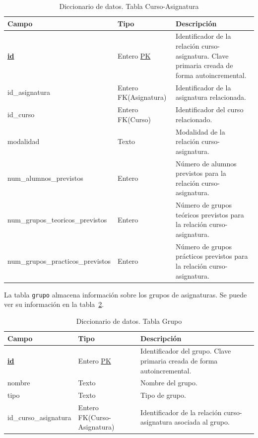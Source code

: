 \begin{table}
  \centering
  \begin{tabular}{l p{} p{}}
    \toprule
    \textbf{Campo} & \textbf{Tipo} & \textbf{Descripción}\\
    \midrule
    \textbf{\underline{id}} & Entero \underline{PK} & Identificador de la relación curso-asignatura. Clave primaria creada de forma autoincremental. \\ \addlinespace
    id\_asignatura & Entero FK(Asignatura) & Identificador de la asignatura relacionada. \\ \addlinespace
    id\_curso & Entero FK(Curso) & Identificador del curso relacionado. \\ \addlinespace
    modalidad & Texto & Modalidad de la relación curso-asignatura. \\ \addlinespace
    num\_alumnos\_previstos & Entero & Número de alumnos previstos para la relación curso-asignatura. \\ \addlinespace
    num\_grupos\_teoricos\_previstos & Entero & Número de grupos teóricos previstos para la relación curso-asignatura. \\ \addlinespace
    num\_grupos\_practicos\_previstos & Entero & Número de grupos prácticos previstos para la relación curso-asignatura. \\
    \bottomrule
  \end{tabular}
  \caption{Diccionario de datos. Tabla Curso-Asignatura}
  \label{tab:diccionario_curso_asignatura}
\end{table}

La tabla \texttt{grupo} almacena información sobre los grupos de asignaturas. 
Se puede ver su información en la tabla~\ref{tab:diccionario_grupo}.

\begin{table}
  \centering 
  \begin{tabular}{l p{} p{}}
    \toprule
    \textbf{Campo} & \textbf{Tipo} & \textbf{Descripción}\\
    \midrule
    \textbf{\underline{id}} & Entero \underline{PK} & Identificador del grupo. Clave primaria creada de forma autoincremental. \\ \addlinespace
    nombre & Texto & Nombre del grupo. \\ \addlinespace
    tipo & Texto & Tipo de grupo. \\ \addlinespace
    id\_curso\_asignatura & Entero FK(Curso-Asignatura) & Identificador de la relación curso-asignatura asociada al grupo. \\
    \bottomrule
  \end{tabular}
  \caption{Diccionario de datos. Tabla Grupo}
  \label{tab:diccionario_grupo}
\end{table}

